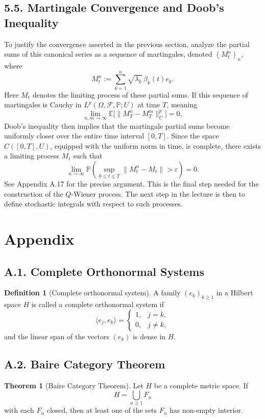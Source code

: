 \documentclass[11pt]{article}
\theoremstyle{definition}
\newtheorem{definition}{Definition}
\newtheorem{theorem}{Theorem}
\theoremstyle{remark}
\begin{document}
\subsection*{5.5. Martingale Convergence and Doob's Inequality}
To justify the convergence asserted in the previous section, analyze the partial sums of this canonical series as a sequence of martingales, denoted \((M_t^n)_n\), where
\[
M_t^n:=\sum_{k=1}^n \sqrt{\lambda_k}\,\beta_k(t)e_k.
\]
Here \(M_t\) denotes the limiting process of these partial sums.
If this sequence of martingales is Cauchy in \(L^p(\Omega,\mathcal F,\mathbb P;U)\) at time \(T\), meaning
\[
\lim_{n,m\to\infty}\mathbb E\bigl[\|M_T^n-M_T^m\|_U^p\bigr]=0,
\]
Doob's inequality then implies that the martingale partial sums become uniformly closer over the entire time interval \([0,T]\). Since the space \(C([0,T],U)\), equipped with the uniform norm in time, is complete, there exists a limiting process \(M_t\) such that
\[
\lim_{n\to\infty}\mathbb P\left(\sup_{0\le t\le T}\|M_t^n-M_t\|>\varepsilon\right)=0.
\]
See Appendix A.17 for the precise argument.
This is the final step needed for the construction of the \(Q\)-Wiener process. The next step in the lecture is then to define stochastic integrals with respect to such processes.

\section*{Appendix}
\subsection*{A.1. Complete Orthonormal Systems}
\begin{definition}[Complete orthonormal system]
A family $(e_k)_{k\ge 1}$ in a Hilbert space $H$ is called a complete orthonormal system if
\[
\langle e_j,e_k\rangle=
\begin{cases}
1,& j=k,\\
0,& j\ne k,
\end{cases}
\]
and the linear span of the vectors $(e_k)$ is dense in $H$.
\end{definition}

\subsection*{A.2. Baire Category Theorem}
\begin{theorem}[Baire Category Theorem]
Let $H$ be a complete metric space. If
\[
H=\bigcup_{n\ge 1} F_n
\]
with each $F_n$ closed, then at least one of the sets $F_n$ has non-empty interior.
\end{theorem}
\end{document}
